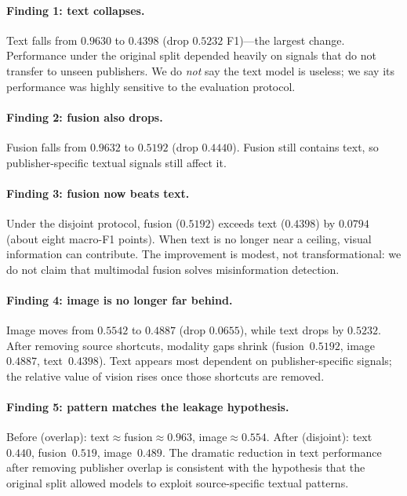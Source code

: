 \documentclass[12pt, a4paper]{report}
\begin{document}
\paragraph{Finding 1: text collapses.}
Text falls from $0.9630$ to $0.4398$ (drop $0.5232$ F1)---the largest change.
Performance under the original split depended heavily on signals that do not transfer to unseen publishers.
We do \emph{not} say the text model is useless; we say its performance was highly sensitive to the evaluation protocol.

\paragraph{Finding 2: fusion also drops.}
Fusion falls from $0.9632$ to $0.5192$ (drop $0.4440$).
Fusion still contains text, so publisher-specific textual signals still affect it.

\paragraph{Finding 3: fusion now beats text.}
Under the disjoint protocol, fusion ($0.5192$) exceeds text ($0.4398$) by $0.0794$ (about eight macro-F1 points).
When text is no longer near a ceiling, visual information can contribute.
The improvement is modest, not transformational: we do not claim that multimodal fusion solves misinformation detection.

\paragraph{Finding 4: image is no longer far behind.}
Image moves from $0.5542$ to $0.4887$ (drop $0.0655$), while text drops by $0.5232$.
After removing source shortcuts, modality gaps shrink (fusion~$0.5192$, image~$0.4887$, text~$0.4398$).
Text appears most dependent on publisher-specific signals; the relative value of vision rises once those shortcuts are removed.

\paragraph{Finding 5: pattern matches the leakage hypothesis.}
Before (overlap): text$\approx$fusion$\approx 0.963$, image$\approx 0.554$.
After (disjoint): text~$0.440$, fusion~$0.519$, image~$0.489$.
The dramatic reduction in text performance after removing publisher overlap is consistent with the hypothesis that the original split allowed models to exploit source-specific textual patterns.
\end{document}
